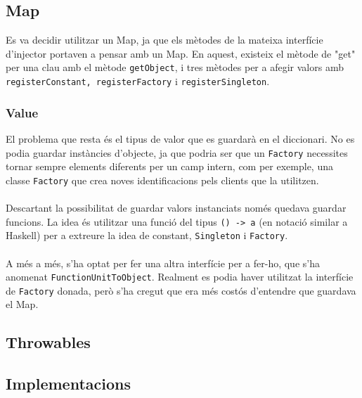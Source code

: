 
\subsection{Map}
Es va decidir utilitzar un Map, ja que els mètodes de la mateixa interfície d'injector portaven a pensar amb un Map. En aquest, existeix
el mètode de "get" per una clau amb el mètode \texttt{getObject}, i tres mètodes per a afegir valors 
amb \texttt{registerConstant, registerFactory} i \texttt{registerSingleton}. 
\subsubsection{Value}
El problema que resta és el tipus de valor que es guardarà en el diccionari. No es podia guardar instàncies d'objecte, ja que podria
ser que un \texttt{Factory} necessites tornar sempre elements diferents per un camp intern, com per exemple, una classe
\texttt{Factory} que crea noves identificacions pels clients que la utilitzen.\\
\\
Descartant la possibilitat de guardar valors instanciats només quedava guardar funcions. La idea és utilitzar una
funció del tipus \texttt{() -> a} (en notació similar a Haskell) per a extreure
la idea de constant, \texttt{Singleton} i \texttt{Factory}.\\
\\
A més a més, s'ha optat per fer una altra interfície per a fer-ho, que s'ha anomenat \texttt{FunctionUnitToObject}. Realment
es podia haver utilitzat la interfície de \texttt{Factory} donada, però s'ha cregut que era més costós d'entendre que 
guardava el Map.
\subsection{Throwables}
\subsection{Implementacions}
